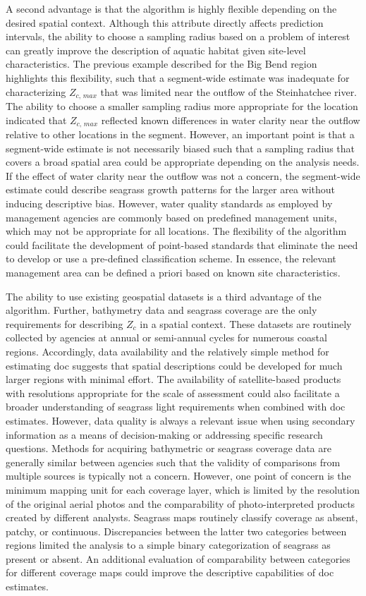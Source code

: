 \documentclass[letterpaper,12pt,oneside]{article}\usepackage[]{graphicx}\usepackage[]{color}
\begin{document}
A second advantage is that the algorithm is highly flexible depending on the desired spatial context.  Although this attribute directly affects prediction intervals, the ability to choose a sampling radius based on a problem of interest can greatly improve the description of aquatic habitat given site-level characteristics.  The previous example described for the Big Bend region highlights this flexibility, such that a segment-wide estimate was inadequate for characterizing $Z_{c,\,max}$ that was limited near the outflow of the Steinhatchee river.  The ability to choose a smaller sampling radius more appropriate for the location indicated that $Z_{c,\,max}$ reflected known differences in water clarity near the outflow relative to other locations in the segment.  However, an important point is that a segment-wide estimate is not necessarily biased such that a sampling radius that covers a broad spatial area could be appropriate depending on the analysis needs.  If the effect of water clarity near the outflow was not a concern, the segment-wide estimate could describe seagrass growth patterns for the larger area without inducing descriptive bias.  However, water quality standards as employed by management agencies are commonly based on predefined management units, which may not be appropriate for all locations.  The flexibility of the algorithm could facilitate the development of point-based standards that eliminate the need to develop or use a pre-defined classification scheme.  In essence, the relevant management area can be defined a priori based on known site characteristics.

The ability to use existing geospatial datasets is a third advantage of the algorithm.  Further, bathymetry data and seagrass coverage are the only requirements for describing $Z_c$ in a spatial context.  These datasets are routinely collected by agencies at annual or semi-annual cycles for numerous coastal regions.  Accordingly, data availability and the relatively simple method for estimating \ac{doc} suggests that spatial descriptions could be developed for much larger regions with minimal effort.  The availability of satellite-based products with resolutions appropriate for the scale of assessment could also facilitate a broader understanding of seagrass light requirements when combined with \ac{doc} estimates.  However, data quality is always a relevant issue when using secondary information as a means of decision-making or addressing specific research questions.  Methods for acquiring bathymetric or seagrass coverage data are generally similar between agencies such that the validity of comparisons from multiple sources is typically not a concern.  However, one point of concern is the minimum mapping unit for each coverage layer, which is limited by the resolution of the original aerial photos and the comparability of photo-interpreted products created by different analysts.  Seagrass maps routinely classify coverage as absent, patchy, or continuous.  Discrepancies between the latter two categories between regions limited the analysis to a simple binary categorization of seagrass as present or absent. An additional evaluation of comparability between categories for different coverage maps could improve the descriptive capabilities of \ac{doc} estimates.
\end{document}
